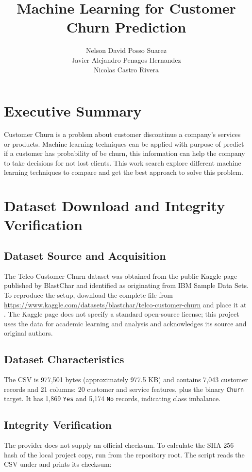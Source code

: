 \documentclass{article}
\title{ Machine Learning for Customer Churn Prediction}
\author{Nelson David Posso Suarez \\ Javier Alejandro Penagos Hernandez \\ Nicolas Castro Rivera }
\date{}
\begin{document}
\maketitle


\section{Executive Summary }
Customer Churn is a problem about customer discontinue a company's services or products. Machine learning techniques can be applied with purpose of predict if a customer 
has probability of be churn, this information can help the company to take decisions for not lost clients. This work search explore different machine learning techniques
to compare and get the best approach to solve this problem. 

\section{Dataset Download and Integrity Verification}

\subsection{Dataset Source and Acquisition}
The Telco Customer Churn dataset was obtained from the public Kaggle page published by 
BlastChar and identified as originating from IBM Sample Data Sets. To reproduce the setup, 
download the complete  
file from \url{https://www.kaggle.com/datasets/blastchar/telco-customer-churn} and 
place it at . 
The Kaggle page does not specify a standard open-source license; this project uses the data 
for academic learning and analysis and acknowledges its source and original authors.

\subsection{Dataset Characteristics}
The CSV is 977,501 bytes (approximately 977.5 KB) and contains 7,043 customer records and 21 columns: 20 customer and service features, plus the binary \texttt{Churn} target. It has 1,869 \texttt{Yes} and 5,174 \texttt{No} records, indicating class imbalance.

\subsection{Integrity Verification}
The provider does not supply an official checksum. To calculate the SHA-256 hash of the local project copy, run  from the repository root. The script reads the CSV under  and prints its checksum:
\end{document}
